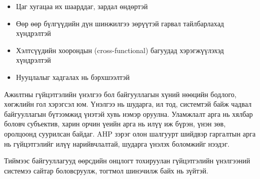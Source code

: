 \begin{enumerate}
\begin{enumerate}
\begin{itemize}
\begin{itemize}
                \item Цаг хугацаа их шаарддаг, зардал өндөртэй
                \item Өөр өөр бүлгүүдийн дүн шинжилгээ зөрүүтэй гарвал тайлбарлахад хүндрэлтэй
                \item Хэлтсүүдийн хоорондын (cross-functional) багуудад хэрэгжүүлэхэд хүндрэлтэй
                \item Нууцлалыг хадгалах нь бэрхшээлтэй
            \end{itemize}
        \end{itemize}
    \end{enumerate}
\end{enumerate}

Ажилтны гүйцэтгэлийн үнэлгээ бол байгууллагын хүний нөөцийн бодлого, хөгжлийн гол хэрэгсэл юм.
 Үнэлгээ нь шударга, ил тод, системтэй байж чадвал байгууллагын бүтээмжид үнэтэй хувь нэмэр оруулна.
  Уламжлалт арга нь хялбар боловч субъектив, харин орчин үеийн арга нь илүү иж бүрэн, үнэн зөв, 
  оролцоонд суурилсан байдаг. AHP зэрэг олон шалгуурт шийдвэр гаргалтын арга нь гүйцэтгэлийг 
  илүү нарийвчлалтай, шударга үнэлэх боломжийг нээдэг.

Тиймээс байгууллагууд өөрсдийн онцлогт тохируулан гүйцэтгэлийн үнэлгээний системээ сайтар боловсруулж,
 тогтмол шинэчилж байх нь зүйтэй.